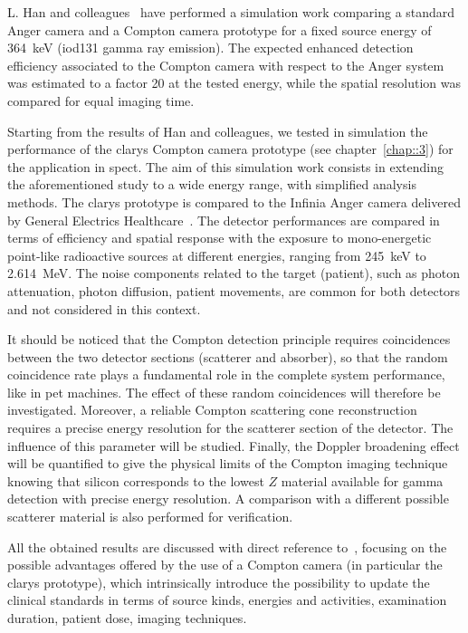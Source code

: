 L. Han and colleagues~\parencite{Han2008} have performed a simulation work comparing a standard Anger camera and a Compton camera prototype for a fixed source energy of 364~keV (\gls{iod131} gamma ray emission). The expected enhanced detection efficiency associated to the Compton camera with respect to the Anger system was estimated to a factor 20 at the tested energy, while the spatial resolution was compared for equal imaging time. 

Starting from the results of Han and colleagues, we tested in simulation the performance of the \gls{clarys} Compton camera prototype (see chapter~\ref{chap::3}) for the application in \gls{spect}. The aim of this simulation work consists in extending the aforementioned study to a wide energy range, with simplified analysis methods. The \gls{clarys} prototype is compared to the Infinia Anger camera delivered by General Electrics Healthcare~\parencite{GeneralElectrics2006}. The detector performances are compared in terms of efficiency and spatial response with the exposure to mono-energetic point-like radioactive sources at different energies, ranging from 245~keV to 2.614~MeV. The noise components related to the target (patient), such as photon attenuation, photon diffusion, patient movements, are common for both detectors and not considered in this context.

It should be noticed that the Compton detection principle requires coincidences between the two detector sections (scatterer and absorber), so that the random coincidence rate plays a fundamental role in the complete system performance, like in \gls{pet} machines. The effect of these random coincidences will therefore be investigated. Moreover, a reliable Compton scattering cone reconstruction requires a precise energy resolution for the scatterer section of the detector. The influence of this parameter will be studied. Finally, the Doppler broadening effect will be quantified to give the physical limits of the Compton imaging technique knowing that silicon corresponds to the lowest $Z$ material available for gamma detection with precise energy resolution. A comparison with a different possible scatterer material is also performed for verification.

All the obtained results are discussed with direct reference to~\parencite{Han2008}, focusing on the possible advantages offered by the use of a Compton camera (in particular the \gls{clarys} prototype), which intrinsically introduce the possibility to update the clinical standards in terms of source kinds, energies and activities, examination duration, patient dose, imaging techniques.


